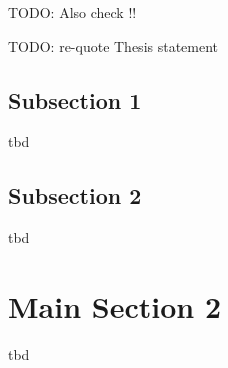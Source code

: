 TODO: Also check \cite{Peffers2012} !!

TODO: re-quote Thesis statement



\subsection{Subsection 1}

tbd



\subsection{Subsection 2}

tbd



\section{Main Section 2}

tbd